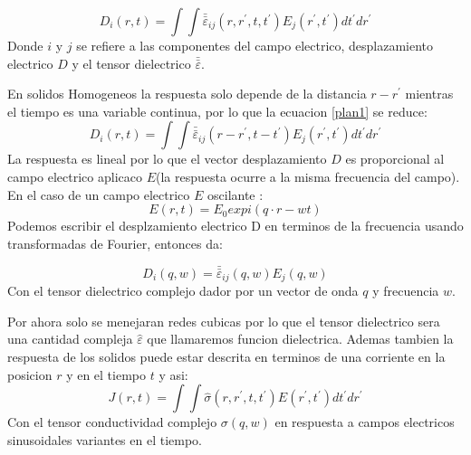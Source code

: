\documentclass[a4paper,openright,12pt]{book}
\begin{document}
\begin{equation}\label{plan1}
D_{i}(r,t)=\int\int \bar{\bar\varepsilon}_{ij}(r,r^{'},t,t^{'}) E_{j}(r^{'},t^{'})dt^{'}dr^{'}
\end{equation}
Donde $i$ y $j$ se refiere a las componentes del campo electrico, desplazamiento electrico $D$ y el tensor dielectrico $\bar{\bar\varepsilon}$. 

En solidos Homogeneos la respuesta solo depende de la distancia $r-r^{'}$ mientras el tiempo es una variable continua, por lo que la ecuacion \ref{plan1} se reduce:
\begin{equation}
D_{i}(r,t)=\int\int \bar{\bar\varepsilon}_{ij}(r-r^{'},t-t^{'})E_{j}(r^{'},t^{'})dt^{'}dr^{'}
\end{equation}
La respuesta es lineal por lo que el vector desplazamiento $D$ es proporcional al campo electrico aplicaco $E$(la respuesta ocurre a la misma frecuencia del campo). En el caso de un campo electrico $E$ oscilante :  
\begin{equation}
E(r,t)=E_{0}exp{i(q\cdot r-wt)}
\end{equation}
Podemos escribir el desplzamiento electrico D en terminos de la frecuencia usando transformadas de Fourier, entonces da:
 

\begin{equation}
D_{i}(q,w)=\bar{\bar\varepsilon}_{ij}(q,w)E_{j}(q,w)
\end{equation}
Con el tensor dielectrico complejo dador por un vector de onda $q$ y frecuencia $w$. 

Por ahora solo se menejaran redes cubicas por lo que el tensor dielectrico sera una cantidad compleja $\hat{\varepsilon}$ que llamaremos funcion dielectrica. Ademas tambien la respuesta de los solidos puede estar descrita en terminos de una corriente en la posicion $r$ y en el tiempo $t$ y asi:
\begin{equation}
J(r,t)=\int\int\hat{\sigma}(r,r^{'},t,t^{'})E(r^{'},t^{'})dt^{'}dr^{'}
\end{equation}
Con el tensor conductividad complejo $\sigma(q,w)$ en respuesta a campos electricos sinusoidales  variantes en el tiempo.
\end{document}
